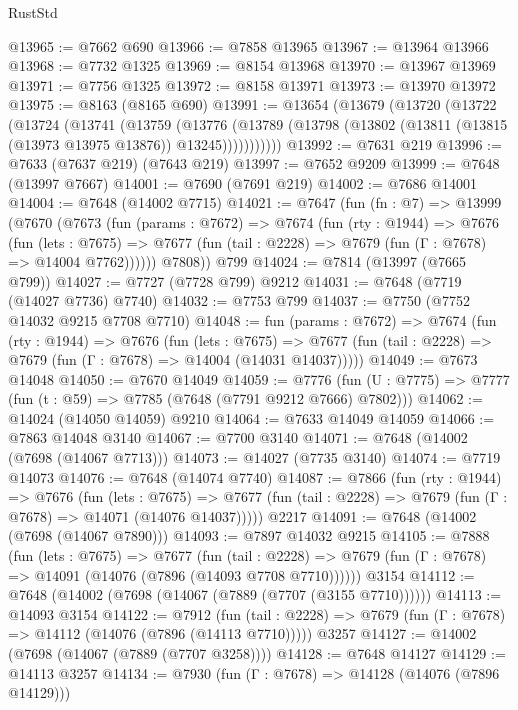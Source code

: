 \begin{lexlean}{RustStd}
\begin{coremodule}
@13965 := @7662 @690
@13966 := @7858 @13965
@13967 := @13964 @13966
@13968 := @7732 @1325
@13969 := @8154 @13968
@13970 := @13967 @13969
@13971 := @7756 @1325
@13972 := @8158 @13971
@13973 := @13970 @13972
@13975 := @8163 (@8165 @690)
@13991 := @13654
    (@13679
      (@13720
        (@13722
          (@13724
            (@13741
              (@13759
                (@13776
                  (@13789 (@13798 (@13802 (@13811 (@13815 (@13973 @13975 @13876)) @13245)))))))))))
@13992 := @7631 @219
@13996 := @7633 (@7637 @219) (@7643 @219)
@13997 := @7652 @9209
@13999 := @7648 (@13997 @7667)
@14001 := @7690 (@7691 @219)
@14002 := @7686 @14001
@14004 := @7648 (@14002 @7715)
@14021 := @7647
    (fun (fn : @7) =>
    @13999
      (@7670
        (@7673
          (fun (params : @7672) =>
          @7674
            (fun (rty : @1944) =>
            @7676
              (fun (lets : @7675) =>
              @7677 (fun (tail : @2228) => @7679 (fun (Γ : @7678) => @14004 @7762))))))
        @7808))
    @799
@14024 := @7814 (@13997 (@7665 @799))
@14027 := @7727 (@7728 @799) @9212
@14031 := @7648 (@7719 (@14027 @7736) @7740)
@14032 := @7753 @799
@14037 := @7750 (@7752 @14032 @9215 @7708 @7710)
@14048 := fun (params : @7672) =>
  @7674
    (fun (rty : @1944) =>
    @7676
      (fun (lets : @7675) =>
      @7677 (fun (tail : @2228) => @7679 (fun (Γ : @7678) => @14004 (@14031 @14037)))))
@14049 := @7673 @14048
@14050 := @7670 @14049
@14059 := @7776
    (fun (U : @7775) => @7777 (fun (t : @59) => @7785 (@7648 (@7791 @9212 @7666) @7802)))
@14062 := @14024 (@14050 @14059) @9210
@14064 := @7633 @14049 @14059
@14066 := @7863 @14048 @3140
@14067 := @7700 @3140
@14071 := @7648 (@14002 (@7698 (@14067 @7713)))
@14073 := @14027 (@7735 @3140)
@14074 := @7719 @14073
@14076 := @7648 (@14074 @7740)
@14087 := @7866
    (fun (rty : @1944) =>
    @7676
      (fun (lets : @7675) =>
      @7677 (fun (tail : @2228) => @7679 (fun (Γ : @7678) => @14071 (@14076 @14037)))))
    @2217
@14091 := @7648 (@14002 (@7698 (@14067 @7890)))
@14093 := @7897 @14032 @9215
@14105 := @7888
    (fun (lets : @7675) =>
    @7677
      (fun (tail : @2228) =>
      @7679 (fun (Γ : @7678) => @14091 (@14076 (@7896 (@14093 @7708 @7710))))))
    @3154
@14112 := @7648 (@14002 (@7698 (@14067 (@7889 (@7707 (@3155 @7710))))))
@14113 := @14093 @3154
@14122 := @7912
    (fun (tail : @2228) => @7679 (fun (Γ : @7678) => @14112 (@14076 (@7896 (@14113 @7710)))))
    @3257
@14127 := @14002 (@7698 (@14067 (@7889 (@7707 @3258))))
@14128 := @7648 @14127
@14129 := @14113 @3257
@14134 := @7930 (fun (Γ : @7678) => @14128 (@14076 (@7896 @14129)))

\end{coremodule}
\end{lexlean}
